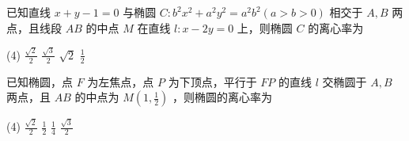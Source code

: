 \begin{example}
    已知直线 $x+y-1=0$ 与椭圆 $C: b^2 x^2+a^2 y^2=a^2 b^2(a>b>0)$ 相交于 $A, B$ 两点，且线段 $A B$ 的中点 $M$ 在直线 $l: x-2 y=0$ 上，则椭圆 $C$ 的离心率为
    \begin{tasks}(4)
        \task $\frac{\sqrt{2}}{2}$
        \task $\frac{\sqrt{3}}{2}$
        \task $\sqrt{2}$
        \task $\frac{1}{2}$
    \end{tasks}
\end{example}

\begin{example}
    已知椭圆，点 $F$ 为左焦点，点 $P$ 为下顶点，平行于 $F P$ 的直线 $l$ 交椭圆于 $A, B$ 两点，且 $A B$ 的中点为 $M\left(1, \frac{1}{2}\right)$ ，则椭圆的离心率为
    \begin{tasks}(4)
        \task $\frac{\sqrt{2}}{2}$
        \task $\frac{1}{2}$
        \task $\frac{1}{4}$
        \task $\frac{\sqrt{3}}{2}$
    \end{tasks}
\end{example}